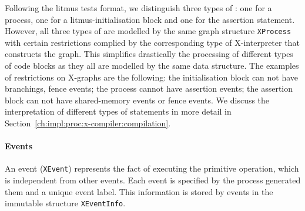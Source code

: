 Following the litmus tests format, we distinguish three types of \xgraph{}: one for a process, one for a litmus-initialisation block and one for the assertion statement.
However, all three types of \xgraph{} are modelled by the same graph structure \texttt{XProcess} with certain restrictions complied by the corresponding type of X-interpreter that constructs the graph. %
This simplifies drastically the processing of different types of code blocks as they all are modelled by the same data structure.
The examples of restrictions on X-graphs are the following: the initialisation block can not have branchings, fence events; the process cannot have assertion events; the assertion block can not have shared-memory events or fence events.
We discuss the interpretation of different types of statements in more detail in Section~\ref{ch:impl:proc:x-compiler:compilation}.


\paragraph{Events}
\label{ch:impl:model:xgraph:evt}

An event (\texttt{XEvent}) represents the fact of executing the primitive operation, which is independent from other events.
Each event is specified by the process generated them and a unique event label.
This information is stored by events in the immutable structure \texttt{XEventInfo}.

